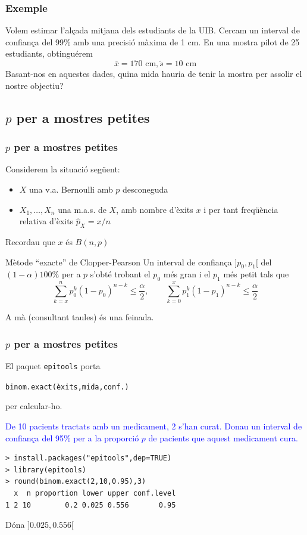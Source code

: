 \documentclass[12pt,t]{beamer}
\newcommand{\blue}[1]{\textcolor{blue}{#1}}
\renewcommand{\leq}{\leqslant}
\theoremstyle{plain}
\theoremstyle{definition}
\begin{document}
\begin{frame}
\frametitle{Exemple}

Volem estimar l'alçada mitjana dels estudiants de la UIB. Cercam  un interval de confiança del 99\% amb una precisió màxima de 1 cm. En una mostra pilot de 25 estudiants, obtinguérem 
$$
\overline{x} = 170\mbox{ cm}, \widetilde{s}=10\mbox{ cm}
$$
Basant-nos en aquestes dades, quina mida hauria de tenir la mostra per assolir el nostre objectiu?

\end{frame}

\subsection{$p$ per a mostres petites}

\begin{frame}
\frametitle{$p$ per a mostres petites}

Considerem la situació següent:
\begin{itemize}
\item  $X$ una v.a. Bernoulli amb $p$ desconeguda

\item $X_1,\ldots,X_n$ una m.a.s. de $X$, amb nombre d'èxits $x$ i per tant freqüència relativa d'èxits $\widehat{p}_{X}=x/n$
\end{itemize}

Recordau que $x$ és $B(n,p)$

\begin{block}{Mètode ``exacte'' de Clopper-Pearson}
Un interval de confiança $]p_0,p_1[$ del $(1-\alpha)100\%$ per a $p$ s'obté trobant el $p_0$ més gran i el $p_1$ més petit tals que
$$
\displaystyle\sum_{k=x}^np_0^k(1-p_0)^{n-k}\leq \frac{\alpha}{2},\qquad
\displaystyle\sum_{k=0}^xp_1^k(1-p_1)^{n-k}\leq \frac{\alpha}{2}
$$
\end{block}
A mà (consultant taules) és una feinada.

\end{frame}




\begin{frame}[fragile]
\frametitle{$p$ per a mostres petites}
\vspace*{-2ex}

El paquet \texttt{epitools} porta
\begin{center}
{\tt binom.exact(èxits,mida,conf.)}
\end{center}
per calcular-ho.
\medskip

\blue{De 10 pacients tractats amb un medicament, 2 s'han curat. Donau un interval de confiança del 95\% per a la proporció $p$ de pacients que aquest medicament cura.}
\begin{verbatim}
> install.packages("epitools",dep=TRUE)
> library(epitools)
> round(binom.exact(2,10,0.95),3)
  x  n proportion lower upper conf.level
1 2 10        0.2 0.025 0.556       0.95
\end{verbatim}
Dóna $]0.025,0.556[$
\end{frame}
\end{document}
